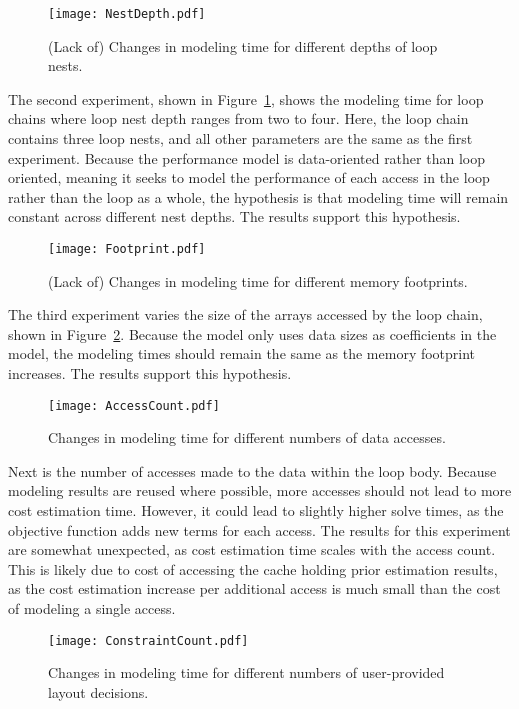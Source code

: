 \begin{figure}
	\texttt{[image: NestDepth.pdf]}
	\caption{(Lack of) Changes in modeling time for different depths of loop nests.}\label{NestDepth}
\end{figure}
The second experiment, shown in Figure~\ref{NestDepth}, shows the modeling time for loop chains where loop nest depth ranges from two to four.
Here, the loop chain contains three loop nests, and all other parameters are the same as the first experiment.
Because the performance model is data-oriented rather than loop oriented, meaning it seeks to model the performance of each access in the loop rather than the loop as a whole, the hypothesis is that modeling time will remain constant across different nest depths.
The results support this hypothesis.

\begin{figure}
\texttt{[image: Footprint.pdf]}
\caption{(Lack of) Changes in modeling time for different memory footprints.}\label{Footprint}
\end{figure}
The third experiment varies the size of the arrays accessed by the loop chain, shown in Figure~\ref{Footprint}.
Because the model only uses data sizes as coefficients in the model, the modeling times should remain the same as the memory footprint increases.
The results support this hypothesis.


\begin{figure}
	\texttt{[image: AccessCount.pdf]}
	\caption{Changes in modeling time for different numbers of data accesses.}\label{AccessCount}
\end{figure}
Next is the number of accesses made to the data within the loop body.
Because modeling results are reused where possible, more accesses should not lead to more cost estimation time. 
However, it could lead to slightly higher solve times, as the objective function adds new terms for each access.
The results for this experiment are somewhat unexpected, as cost estimation time scales with the access count.
This is likely due to cost of accessing the cache holding prior estimation results, as the cost estimation increase per additional access is much small than the cost of modeling a single access.

\begin{figure}
	\texttt{[image: ConstraintCount.pdf]}
	\caption{Changes in modeling time for different numbers of user-provided layout decisions.}\label{ConstraintCount}
\end{figure}

